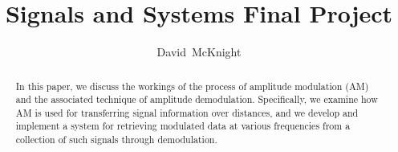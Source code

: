 \documentclass[journal]{IEEEtran}
\begin{document}
\title{Signals and Systems Final Project}

\author{David~McKnight}

%
{}
% 

\maketitle

\begin{abstract}
In this paper, we discuss the workings of the process of amplitude modulation (AM) and the associated technique of amplitude demodulation. Specifically, we examine how AM is used for transferring signal information over distances, and we develop and implement a system for retrieving modulated data at various frequencies from a collection of such signals through demodulation.
\end{abstract}
\end{document}
